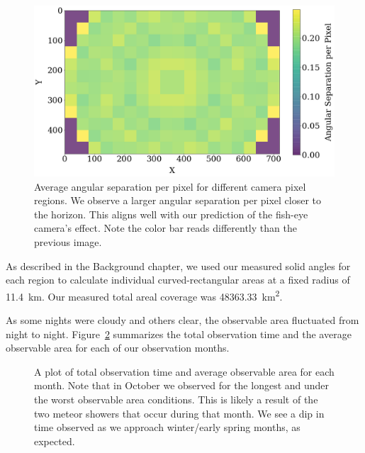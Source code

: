 \begin{figure}[ht!]
  \centering
  \includegraphics[scale=0.35]{images/boxes_colored.png}
  \caption[Average angular separation per pixel for different camera pixel regions.]{Average angular separation per pixel for different camera pixel regions.  We observe a larger angular separation per pixel closer to the horizon.  This aligns well with our prediction of the fish-eye camera's effect. Note the color bar reads differently than the previous image.}
  \label{colorful}
\end{figure}

As described in the Background chapter, we used our measured solid angles for each region to calculate individual  curved-rectangular areas at a fixed radius of \SI{11.4}{\kilo\meter}.
Our measured total areal coverage was  \SI{48363.33}{\square\kilo\meter}.

As some nights were cloudy and others clear, the observable area fluctuated from night to night. 
Figure~\ref{time_area} summarizes the total observation time and the average observable area for each of our observation months. 

\begin{figure}[ht!]
  \centering
  \caption[A plot of total observation time and average observable area for each month.]{A plot of total observation time and average observable area for each month.  Note that in October we observed for the longest and under the worst observable area conditions.  This is likely a result of the two meteor showers that occur during that month.  We see a dip in time observed as we approach winter/early spring months, as expected.}
  \label{time_area}
\end{figure}

